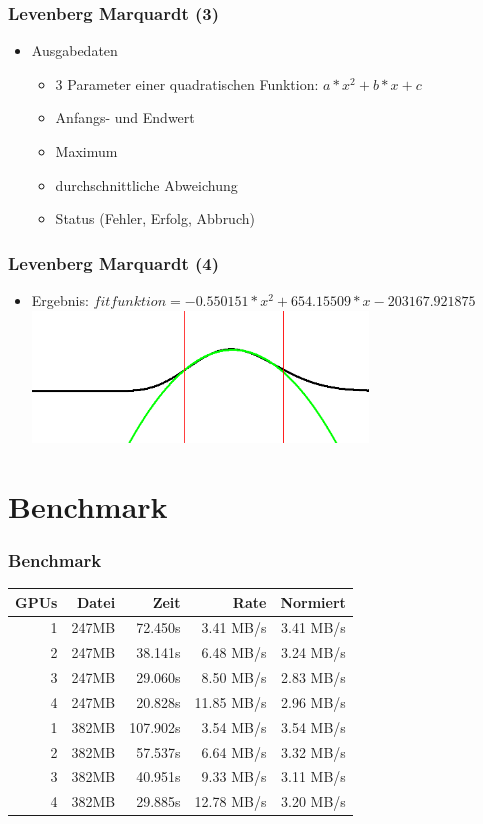 \documentclass[ddcfooter]{tudbeamer}
\begin{document}
\begin{frame}
    \frametitle*{Levenberg Marquardt (3)}
	\begin{itemize}
        \item{Ausgabedaten}
        	\begin{itemize}
        		\item{3 Parameter einer quadratischen Funktion: $a*x^2+b*x+c$}
        		\item{Anfangs- und Endwert}
        		\item{Maximum}
        		\item{durchschnittliche Abweichung}
        		\item{Status (Fehler, Erfolg, Abbruch)}
        		
        	\end{itemize}
    \end{itemize}
\end{frame}
\begin{frame}
    \frametitle*{Levenberg Marquardt (4)}
	\begin{itemize}
        \item{Ergebnis: $fitfunktion=-0.550151*x^2+654.15509*x-203167.921875$}
        \includegraphics[height=3.5cm]{Beispielergebnis.png}
    \end{itemize}
\end{frame}
\section{Benchmark}
\begin{frame}
    \frametitle*{Benchmark}
    \begin{center}
    \begin{tabular}{|r|r|r|r|r|}
    \hline
	GPUs & Datei    & Zeit     & Rate       & Normiert  \\
	\hline
	1    & 247MB	& 72.450s  &  3.41 MB/s & 3.41 MB/s \\
	2	 & 247MB	& 38.141s  &  6.48 MB/s & 3.24 MB/s \\
	3	 & 247MB	& 29.060s  &  8.50 MB/s & 2.83 MB/s \\
	4	 & 247MB	& 20.828s  & 11.85 MB/s & 2.96 MB/s \\
	1	 & 382MB	& 107.902s &  3.54 MB/s & 3.54 MB/s \\
	2	 & 382MB	& 57.537s  &  6.64 MB/s & 3.32 MB/s \\
	3	 & 382MB	& 40.951s  &  9.33 MB/s & 3.11 MB/s \\
	4	 & 382MB	& 29.885s  & 12.78 MB/s & 3.20 MB/s \\
	\hline
	\end{tabular}
	\end{center}
\end{frame}
\end{document}
